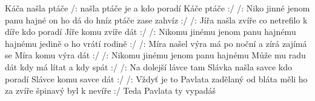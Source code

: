\begin{TEXT}{Káča našla ptáče}
\SLOKA /:  našla ptáče je  a 
kdo poradí Káče  ptáče  :/
/: Niko jinné jenom panu hajné
on ho dá do hníz ptáče zase zahvíz :/
\SLOKA /: Jířa našla zvíře co netrefilo k díře
kdo poradí Jíře komu zvíře dát :/
/: Nikomu jinému jenom panu hajnému 
hajnému jedině o ho vrátí rodině :/
\SLOKA /: Míra našel výra má po noční a zírá
zajímá se Míra komu výra dát :/
/: Nikomu jinému jenom panu hajnému 
Může mu radu dát kdy má lítat a kdy spát :/
\SLOKA /: Na dolejší lávce tam Slávka našla savce
kdo poradí Slávce komu savce dát :/
/: Vždyť je to Pavlata zadělaný od bláta
měli ho za zvíře špinavý byl k nevíře :/
\INTERM Teda Pavlata ty vypadáš
\end{TEXT}